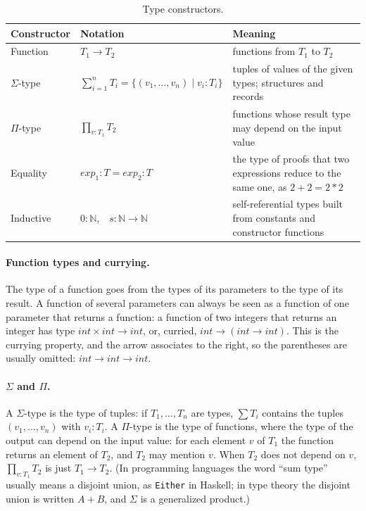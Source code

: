 \begin{table}[h]
\centering
\small
\renewcommand{\arraystretch}{1.25}
\begin{tabular}{l l p{}}
  \toprule
  Constructor & Notation & Meaning \\
  \midrule
  Function   & $T_1 \to T_2$ & functions from $T_1$ to $T_2$ \\
  $\Sigma$-type & $\sum_{i=1}^{n} T_i = \{(v_1, \dots, v_n) \mid v_i : T_i\}$ & tuples of values of the given types; structures and records \\
  $\Pi$-type & $\prod_{v : T_1} T_2$ & functions whose result type may depend on the input value \\
  Equality   & $\mathit{exp}_1 : T = \mathit{exp}_2 : T$ & the type of proofs that two expressions reduce to the same one, as $2 + 2 = 2 * 2$ \\
  Inductive  & $0 : \mathbb{N}$,\ \ $s : \mathbb{N} \to \mathbb{N}$ & self-referential types built from constants and constructor functions \\
  \bottomrule
\end{tabular}
\caption{Type constructors.}
\label{tab:constructors}
\end{table}

\paragraph{Function types and currying.} The type of a function goes from the
types of its parameters to the type of its result. A function of several
parameters can always be seen as a function of one parameter that returns a
function: a function of two integers that returns an integer has type
$\mathit{int} \times \mathit{int} \to \mathit{int}$, or, curried,
$\mathit{int} \to (\mathit{int} \to \mathit{int})$. This is the currying property,
and the arrow associates to the right, so the parentheses are usually omitted:
$\mathit{int} \to \mathit{int} \to \mathit{int}$.

\paragraph{$\Sigma$ and $\Pi$.} A $\Sigma$-type is the type of tuples: if $T_1,
\dots, T_n$ are types, $\sum T_i$ contains the tuples $(v_1, \dots, v_n)$ with
$v_i : T_i$. A $\Pi$-type is the type of functions, where the type of the output
can depend on the input value: for each element $v$ of $T_1$ the function
returns an element of $T_2$, and $T_2$ may mention $v$. When $T_2$ does not
depend on $v$, $\prod_{v : T_1} T_2$ is just $T_1 \to T_2$. (In programming
languages the word ``sum type'' usually means a disjoint union, as
\texttt{Either} in Haskell; in type theory the disjoint union is written
$A + B$, and $\Sigma$ is a generalized product.)


